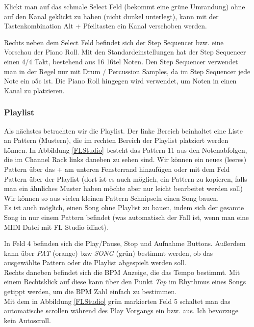 Klickt man auf das schmale Select Feld (bekommt eine grüne Umrandung) ohne auf den Kanal geklickt zu haben (nicht dunkel unterlegt), kann mit der Tastenkombination Alt + Pfeiltasten ein Kanal verschoben werden.

\bigskip

Rechts neben dem Select Feld befindet sich der Step Sequencer bzw. eine Vorschau der Piano Roll. Mit den Standardeinstellungen hat der Step Sequencer einen 4/4 Takt, bestehend aus 16 16tel Noten. Den Step Sequencer verwendet man in der Regel nur mit Drum / Percussion Samples, da im Step Sequencer jede Note ein o5c ist. Die Piano Roll hingegen wird verwendet, um Noten in einen Kanal zu platzieren.

\subsubsection*{Playlist}

Als nächstes betrachten wir die Playlist. Der linke Bereich beinhaltet eine Liste an Pattern (Mustern), die im rechten Bereich der Playlist platziert werden können. In Abbildung \ref{FLStudio} besteht das Pattern 11 aus den Notenabfolgen, die im Channel Rack links daneben zu sehen sind. Wir können ein neues (leeres) Pattern über das + am unteren Fensterrand hinzufügen oder mit dem Feld Pattern über der Playlist (dort ist es auch möglich, ein Pattern zu kopieren, falls man ein ähnliches Muster haben möchte aber nur leicht bearbeitet werden soll)
Wir können so aus vielen kleinen Pattern Schnipseln einen Song bauen. \\
Es ist auch möglich, einen Song ohne Playlist zu bauen, indem sich der gesamte Song in nur einem Pattern befindet (was automatisch der Fall ist, wenn man eine MIDI Datei mit FL Studio öffnet).

\bigskip

In Feld 4 befinden sich die Play/Pause, Stop und Aufnahme Buttons. Außerdem kann über \textit{PAT} (orange) bzw \textit{SONG} (grün) bestimmt werden, ob das ausgewählte Pattern oder die Playlist abgespielt werden soll. \\
Rechts daneben befindet sich die BPM Anzeige, die das Tempo bestimmt. Mit einem Rechtsklick auf diese kann über den Punkt \textit{Tap} im Rhythmus eines Songs getippt werden, um die BPM Zahl einfach zu bestimmen. \\

Mit dem in Abbildung \ref{FLStudio} grün markierten Feld 5 schaltet man das automatische scrollen während des Play Vorgangs ein bzw. aus. Ich bevorzuge kein Autoscroll.

